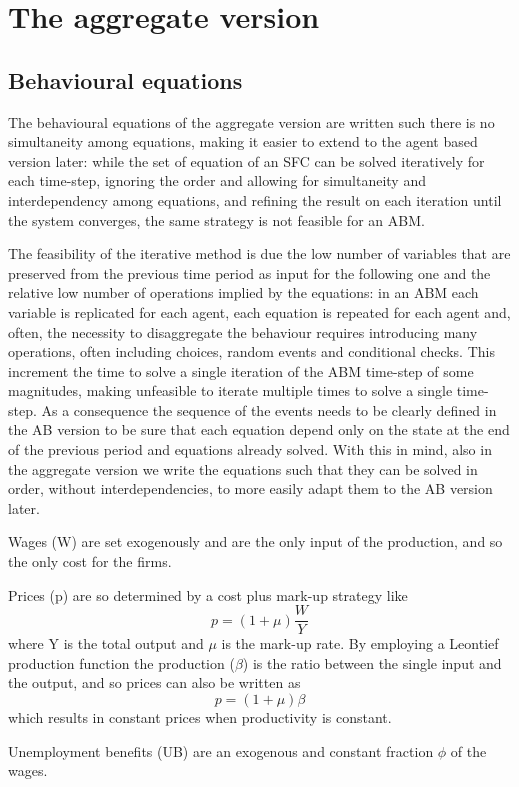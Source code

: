 \section{The aggregate version}
\subsection{Behavioural equations}
\label{sec:behave}
The behavioural equations of the aggregate version are written such there is no simultaneity among equations, making it easier to extend to the agent based version later: while the set of equation of an SFC can be solved iteratively for each time-step, ignoring the order and allowing for simultaneity and interdependency among equations, and refining the result on each iteration until the system converges, the same strategy is not feasible for an ABM.

The feasibility of the iterative method is due the low number of variables that are preserved from the previous time period as input for the following one and the relative low number of operations implied by the equations: in an ABM each variable is replicated for each agent, each equation is repeated for each agent and, often, the necessity to disaggregate the behaviour requires introducing many operations, often including choices, random events and conditional checks.
This increment the time to solve a single iteration of the ABM time-step of some magnitudes, making unfeasible to iterate multiple times to solve a single time-step.
As a consequence the sequence of the events needs to be clearly defined in the AB version to be sure that each equation depend only on the state at the end of the previous period and equations already solved.
With this in mind, also in the aggregate version we write the equations such that they can be solved in order, without interdependencies, to more easily adapt them to the AB version later.

Wages (W) are set exogenously and are the only input of the production, and so the only cost for the firms.

Prices (p) are so determined by a cost plus mark-up strategy like $$p = (1 + \mu) \frac{W}{Y}$$ where Y is the total output and $\mu$ is the mark-up rate.
By employing a Leontief production function the production ($\beta$) is the ratio between the single input and the output, and so prices can also be written as $$p= (1+\mu) \beta$$ which results in constant prices when productivity is constant.

Unemployment benefits (UB) are an exogenous and constant fraction $\phi$ of the wages.


